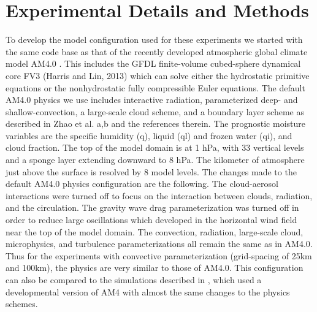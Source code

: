 \documentclass[draft]{agujournal2019}
\begin{document}
\section{Experimental Details and Methods}

To develop the model configuration used for these experiments we started with the same code base as that of the 
recently developed atmospheric global climate model AM4.0 \cite{Zhao_etal18a, Zhao_etal18b}.
This includes the GFDL finite-volume cubed-sphere dynamical core FV3 (Harris and Lin, 2013) 
which can solve either the hydrostatic primitive equations or the nonhydrostatic fully compressible Euler equations.  
The default AM4.0 physics we use includes interactive radiation, parameterized deep- and shallow-convection, 
a large-scale cloud scheme, and a boundary layer 
scheme as described in Zhao et al. a,b and the references therein.  The prognostic moisture variables are the specific 
humidity (q), liquid (ql) and frozen water (qi), and cloud fraction.  The top of the model domain is at 1 hPa, with 33 vertical 
levels and a sponge layer extending downward to 8 hPa.  The kilometer of atmosphere just above the surface is resolved by 
8 model levels.  The changes made to the default AM4.0 physics configuration are the following.  The cloud-aerosol 
interactions were turned off to focus on the interaction between clouds, radiation, and the circulation.  The gravity wave drag 
parameterization was turned off 
in order to reduce large oscillations which developed in the horizontal wind field near the top of the model domain.  
The convection, radiation, large-scale cloud, microphysics, and turbulence parameterizations all remain the same 
as in AM4.0.   Thus for the experiments with convective parameterization (grid-spacing of 25km and 100km), the 
physics are very similar to those of AM4.0.  This configuration can also be compared to the simulations described in 
\cite{Popp2017}, %
which used a developmental version of AM4 with almost the same changes to the physics
schemes.
\end{document}
